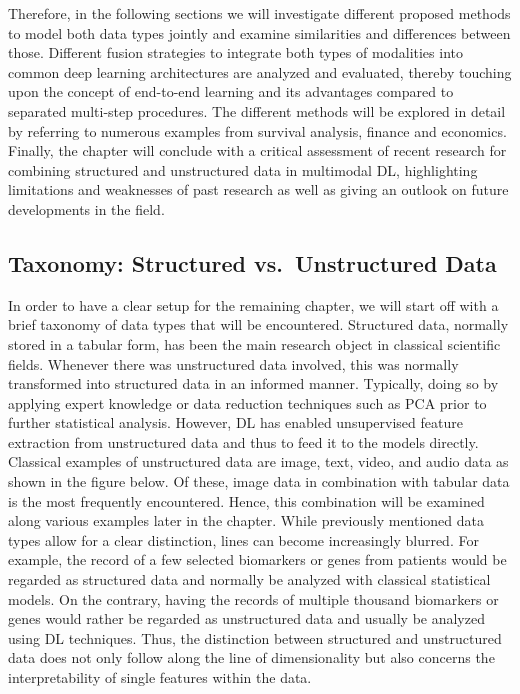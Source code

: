 \documentclass[
]{krantz}
\begin{document}
Therefore, in the following sections we will investigate different proposed methods to model both data types jointly and examine similarities and differences between those. Different fusion strategies to integrate both types of modalities into common deep learning architectures are analyzed and evaluated, thereby touching upon the concept of end-to-end learning and its advantages compared to separated multi-step procedures. The different methods will be explored in detail by referring to numerous examples from survival analysis, finance and economics.
Finally, the chapter will conclude with a critical assessment of recent research for combining structured and unstructured data in multimodal DL, highlighting limitations and weaknesses of past research as well as giving an outlook on future developments in the field.

\hypertarget{taxonomy-structured-vs.-unstructured-data}{%
\subsection{Taxonomy: Structured vs.~Unstructured Data}\label{taxonomy-structured-vs.-unstructured-data}}

In order to have a clear setup for the remaining chapter, we will start off with a brief taxonomy of data types that will be encountered. Structured data, normally stored in a tabular form, has been the main research object in classical scientific fields. Whenever there was unstructured data involved, this was normally transformed into structured data in an informed manner. Typically, doing so by applying expert knowledge or data reduction techniques such as PCA prior to further statistical analysis. However, DL has enabled unsupervised feature extraction from unstructured data and thus to feed it to the models directly. Classical examples of unstructured data are image, text, video, and audio data as shown in the figure below. Of these, image data in combination with tabular data is the most frequently encountered. Hence, this combination will be examined along various examples later in the chapter. While previously mentioned data types allow for a clear distinction, lines can become increasingly blurred. For example, the record of a few selected biomarkers or genes from patients would be regarded as structured data and normally be analyzed with classical statistical models. On the contrary, having the records of multiple thousand biomarkers or genes would rather be regarded as unstructured data and usually be analyzed using DL techniques. Thus, the distinction between structured and unstructured data does not only follow along the line of dimensionality but also concerns the interpretability of single features within the data.
\end{document}

